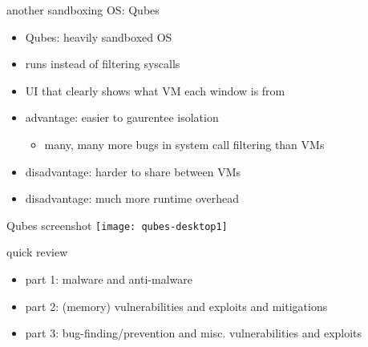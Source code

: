 \begin{frame}{another sandboxing OS: Qubes}
    \begin{itemize}
    \item Qubes: heavily sandboxed OS
    \item runs  instead of filtering syscalls
    \item UI that clearly shows what VM each window is from
    \vspace{.5cm}
    \item advantage: easier to gaurentee isolation
        \begin{itemize}
        \item many, many more bugs in system call filtering than VMs
        \end{itemize}
    \item disadvantage: harder to share between VMs
    \item disadvantage: much more runtime overhead
    \end{itemize}
\end{frame}

\begin{frame}{Qubes screenshot}
    \vspace{-.5cm}
    \texttt{[image: qubes-desktop1]}
\end{frame}



\begin{frame}{quick review}
    \begin{itemize}
    \item part 1: malware and anti-malware
    \item part 2: (memory) vulnerabilities and exploits and mitigations
    \item part 3: bug-finding/prevention and misc. vulnerabilities and exploits
    \end{itemize}
\end{frame}

